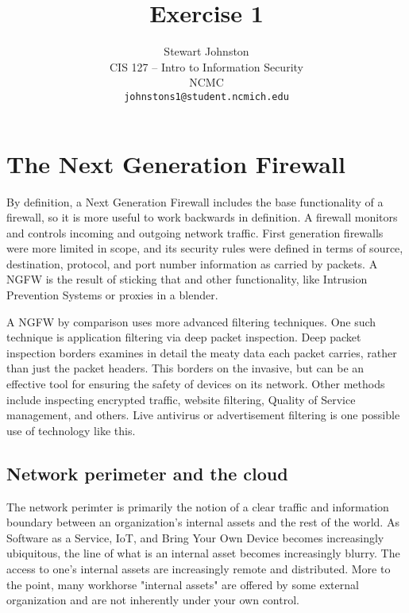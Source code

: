 \documentclass{article}
\title{Exercise 1}
\author{Stewart Johnston\\
  {CIS 127 -- Intro to Information Security}\\
  {NCMC}\\
  {\texttt{johnstons1@student.ncmich.edu}}
}
\date
\begin{document}
\maketitle


\section{The Next Generation Firewall}

By definition, a Next Generation Firewall includes the base functionality of a
firewall, so it is more useful to work backwards in definition. A firewall
monitors and controls incoming and outgoing network traffic. First generation
firewalls were more limited in scope, and its security rules were defined in
terms of source, destination, protocol, and port number information as carried
by packets. A NGFW is the result of sticking that and other functionality, like
Intrusion Prevention Systems or proxies in a blender.

A NGFW by comparison uses more advanced filtering techniques. One such
technique is application filtering via deep packet inspection. Deep packet
inspection borders examines in detail the meaty data each packet carries,
rather than just the packet headers. This borders on the invasive, but can be
an effective tool for ensuring the safety of devices on its network. Other
methods include inspecting encrypted traffic, website filtering, Quality of
Service management, and others. Live antivirus or advertisement filtering is
one possible use of technology like this.


\subsection{Network perimeter and the cloud}

The network perimter is primarily the notion of a clear traffic and information
boundary between an organization's internal assets and the rest of the world.
As Software as a Service, IoT, and Bring Your Own Device becomes increasingly
ubiquitous, the line of what is an internal asset becomes increasingly blurry.
The access to one's internal assets are increasingly remote and distributed.
More to the point, many workhorse "internal assets" are offered by some
external organization and are not inherently under your own control.
\end{document}
